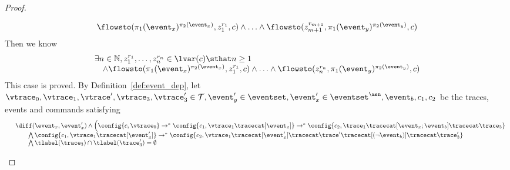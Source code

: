 \begin{proof}
\begin{case}
            \[
              \begin{array}{l}
              \flowsto(\pi_1(\event_x)^{\pi_2(\event_x)},  z_1^{r_1}, c) 
              \land \ldots 
               \land  \flowsto(z_{m+1}^{r_{m+1}}, \pi_1(\event_y)^{\pi_2(\event_y)}, c) 
              \end{array}
              \]            
              Then we know
              \[
                \begin{array}{l}
                  \exists n \in \mathbb{N}, z_1^{r_1}, \ldots, z_n^{r_n} \in \lvar(c) \sthat  n \geq 1 
                  \\ \quad  
                  \land
                \flowsto(\pi_1(\event_x)^{\pi_2(\event_x)},  z_1^{r_1}, c) 
                \land \ldots 
                 \land  \flowsto(z_{n}^{r_{n}}, \pi_1(\event_y)^{\pi_2(\event_y)}, c) 
                \end{array}
                \]               
            This case is proved.
        By Definition~\ref{def:event_dep}, let $\vtrace_0,
        \vtrace_1, \vtrace', \vtrace_3, \vtrace_3' \in \mathcal{T}, 
        \event_y' \in \eventset, \event_x' \in \eventset^{\asn}, \event_b, {c}_1, {c}_2$ be the traces, events and commands satisfying
        \[
          \begin{array}{ll}   
            & \diff(\event_x, \event_x') 
        \land
           \Big(
          \config{{c}, \vtrace_0} \rightarrow^{*} 
              \config{{c}_1, \vtrace_1 \tracecat [\event_x]}  \rightarrow^{*} 
              \config{c_2,  \trace_1 \tracecat [\event_x;\event_b] \tracecat  \trace_3} 
            \\   
           & \qquad \bigwedge 
            \config{{c}_1, \vtrace_1 \tracecat [\event_x']}  \rightarrow^{*} 
            \config{c_2,  \vtrace_1 \tracecat [\event_x'] \tracecat \trace' \tracecat [(\neg \event_b)] \tracecat \trace_3'} 
            \\
            & \qquad \bigwedge  \tlabel({\trace_3}) \cap \tlabel({\trace_3'}) = \emptyset

\end{array}\]
\end{case}
\end{proof}
